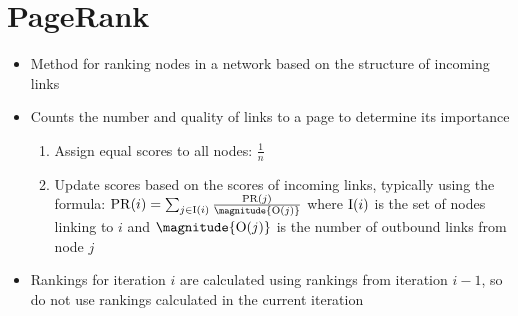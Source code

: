 \section{PageRank}

\begin{itemize}
    \item Method for ranking nodes in a network based on the structure of incoming links
    \item Counts the number and quality of links to a page to determine its importance
          \begin{enumerate}
              \item Assign equal scores to all nodes: $\frac{1}{n}$
              \item Update scores based on the scores of incoming links, typically using the formula: \(\PageRank(i) = \sum_{j \in \InboundLinks(i)} \frac{\PageRank(j)}{\magnitude{\OutboundLinks(j)}}\) where $\operatorname{I}(i)$ is the set of nodes linking to $i$ and $\magnitude{\OutboundLinks(j)}$ is the number of outbound links from node $j$
          \end{enumerate}
    \item Rankings for iteration $i$ are calculated using rankings from iteration $i - 1$, so do not use rankings calculated in the current iteration
\end{itemize}

